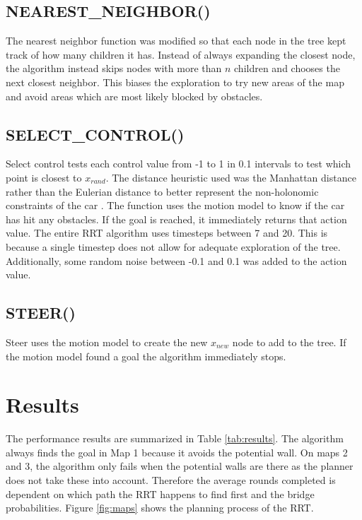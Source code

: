 \documentclass[a4paper, 11pt]{article}
\begin{document}
\subsection{NEAREST\_NEIGHBOR()}
The nearest neighbor function was modified so that each node in the tree kept track of how many children it has. Instead of always expanding the closest node, the algorithm instead skips nodes with more than $n$ children and chooses the next closest neighbor. This biases the exploration to try new areas of the map and avoid areas which are most likely blocked by obstacles. 

\subsection{SELECT\_CONTROL()}
Select control tests each control value from -1 to 1 in 0.1 intervals to test which point is closest to $x_{rand}$. The distance heuristic used was the Manhattan distance rather than the Eulerian distance to better represent the non-holonomic constraints of the car \cite{Li2014}. The function uses the motion model to know if the car has hit any obstacles. If the goal is reached, it immediately returns that action value. The entire RRT algorithm uses timesteps between 7 and 20. This is because a single timestep does not allow for adequate exploration of the tree. Additionally, some random noise between -0.1 and 0.1 was added to the action value.

\subsection{STEER()}
Steer uses the motion model to create the new $x_{new}$ node to add to the tree. If the motion model found a goal the algorithm immediately stops. 


\section{Results}

The performance results are summarized in Table \ref{tab:results}. The algorithm always finds the goal in Map 1 because it avoids the potential wall. On maps 2 and 3, the algorithm only fails when the potential walls are there as the planner does not take these into account. Therefore the average rounds completed is dependent on which path the RRT happens to find first and the bridge probabilities. Figure \ref{fig:maps} shows the planning process of the RRT. 
\end{document}
